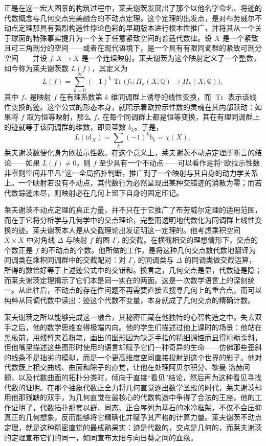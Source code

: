 \documentclass[12pt,a4paper]{article}
\begin{document}
正是在这一宏大图景的构筑过程中，莱夫谢茨发展出了那个以他名字命名、将迹的代数概念与几何交点完美融合的不动点定理。这个定理的出发点，是对布劳威尔不动点定理那具有强烈构造性悖论色彩的早期版本进行根本性推广，并将其从一个关于球面的特殊事实提升为一个关于任意紧致空间的普适代数律。设 $X$ 是一个紧致且可三角剖分的空间——或者在现代语境下，是一个具有有限同调群的紧致可剖分空间——并设 $f: X \to X$ 是一个连续映射。莱夫谢茨为这个映射定义了一个整数，如今称为莱夫谢茨数 $L(f)$，其定义为
$$
L(f) = \sum_{k=0}^{\infty} (-1)^k \operatorname{Tr}\big(f_*: H_k(X; \mathbb{Q}) \to H_k(X; \mathbb{Q})\big),
$$
其中 $f_*$ 是映射 $f$ 在有理系数第 $k$ 维同调群上诱导的线性变换，而 $\operatorname{Tr}$ 表示该线性变换的迹。这个公式的形态本身，就昭示着欧拉示性数的灵魂在其内部跃动：如果将 $f$ 取为恒等映射，那么 $f_*$ 在每个同调群上都是恒等变换，其在有理同调群上的迹就等于该同调群的维数，即贝蒂数 $b_k$。于是，
$$
L(\mathrm{id}_X) = \sum_{k} (-1)^k b_k = \chi(X),
$$
莱夫谢茨数便化身为欧拉示性数。在这个意义上，莱夫谢茨不动点定理所断言的结论——如果 $L(f) \neq 0$，则 $f$ 至少具有一个不动点——可以看作是将“欧拉示性数非零则空间非平凡”这一全局拓扑判断，推广到了一个映射与其自身的动力学关系上。一个映射若没有不动点，其代数行为必然呈现出某种交错迹的消散为零；而若代数踪迹未尽，则映射必在几何上留下自身的固定印记。

莱夫谢茨不动点定理的真正力量，并不只在于它推广了布劳威尔定理的适用范围，而在于它将分析学与几何学中的交点理论，完整而透明地代数化为同调群上线性变换的迹。莱夫谢茨本人是从交截理论出发证明这一定理的。他考虑乘积空间 $X \times X$ 中对角线 $\Delta$ 与映射 $f$ 的图 $\Gamma_f$ 的交截。在横截相交的理想情形下，交点的个数正是 $f$ 的不动点的个数。他所做的工作，是将这种几何交点数代数地翻译为同调类在乘积同调群中的交截配对：对 $\Gamma_f$ 的同调类与 $\Delta$ 的同调类做交截运算，所得的数恰好等于上述迹公式中的交错和。换言之，几何交点是显，代数迹是隐；而莱夫谢茨定理揭示了它们本是同一实在的两面。这是一次数学语言上的深刻统一。从此往后，不动点的存在性问题不再需要直接去搜寻几何上的重合点，而可以纯粹从同调代数中读出：迹这个代数不变量，本身就成了几何交点的精确计数。

莱夫谢茨之所以能够完成这一融合，其秘密正藏在他独特的心智构造之中。失去双手之后，他的数学思维变得极端内向。他的学生们描述过他上课时的场景：他站在黑板前，用残臂夹着粉笔，画出的图形因为缺乏手指的精细调控而显得粗粝歪斜，但他嘴里描述这些图形时使用的语言却赋予它们一种奇异的生命——仿佛那些歪斜的线条不是拙劣的模拟，而是一个更高维度空间直接投射到这个世界的影子。他对代数簇上相交曲线、曲面和除子的直觉，让他在处理阿贝尔积分、黎曼-洛赫问题、以及代数曲面的拓扑分类时，倾向于直接“看见”结论，然后再为这种看见寻找代数的证明。在那个抽象代数正全力将几何直觉逐出数学圣殿的时代，莱夫谢茨却用他那残缺的双手，为几何直觉在最核心的代数构造中争得了合法的王座。他的工作证明了，代数拓扑那套以群、同态、正合序列为基石的冰冷框架，不仅不会压抑真正的几何想象，反而能够将它精确化并赋予其严格的计算力量。莱夫谢茨不动点定理，就是这种精密直觉的最成熟果实：迹是代数的，交点是几何的，而莱夫谢茨的定理宣布它们的同一，如同宣布太阳与向日葵之间的血缘。
\end{document}
